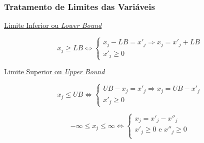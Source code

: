 \begin{frame}
	\frametitle{Tratamento de Limites das Variáveis}
	{
	\underline{Limite Inferior ou \textit{Lower  Bound}}
	\begin{mdframed}[backgroundcolor=blue!20]
		\begin{equation*}
			x_j \ge LB \Leftrightarrow
			\left\{ \begin{matrix}
						x_j - LB = {x}'_j \Rightarrow x_j = {x}'_j + LB \\
						{x}'_j \ge 0
					\end{matrix}  
			\right.
		\end{equation*}
	\end{mdframed}	
	}
	
	{
	\vspace{0.5cm}
	\underline{Limite Superior ou \textit{Upper  Bound}}
	\begin{mdframed}[backgroundcolor=red!20]
		\begin{equation*}
			x_j \le UB \Leftrightarrow
			\left\{ \begin{matrix}
						UB - x_j = {x}'_j \Rightarrow x_j = UB - {x}'_j  \\
						{x}'_j \ge 0
					\end{matrix}  
			\right.
		\end{equation*}
	\end{mdframed}
	}

	{
	\vspace{0.5cm}
	\begin{mdframed}[backgroundcolor=green!20]
		\begin{equation*}
			- \infty \le x_j \le \infty \Leftrightarrow
			\left\{ \begin{matrix}
						x_j = {x}'_j - {x}''_j \\
						{x}'_j \ge 0 \text{ e } {x}''_j \ge 0  \\
					\end{matrix}  
			\right.
		\end{equation*}
	\end{mdframed}
	}
\end{frame}

